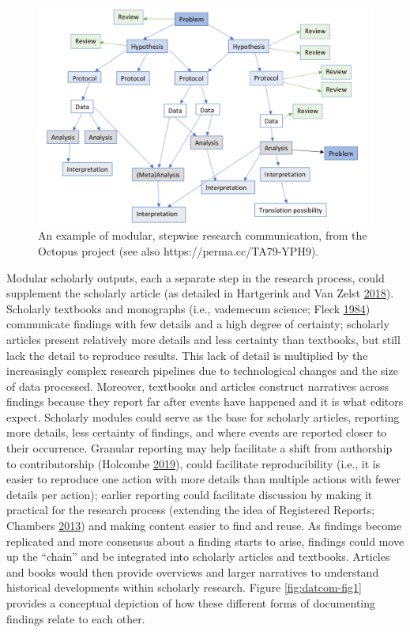 \documentclass[a5paper]{book}
\begin{document}
\begin{figure}[h]
\includegraphics[width=1\linewidth]{assets/figures/fig-octo} \caption{An example of modular, stepwise research communication, from the Octopus project (see also https://perma.cc/TA79-YPH9).}\label{fig:octopi}
\end{figure}

Modular scholarly outputs, each a separate step in the research process,
could supplement the scholarly article (as detailed in Hartgerink and
Van Zelst
\protect\hyperlink{ref-doi:10.3390ux2fpublications6020021}{2018}).
Scholarly textbooks and monographs (i.e., vademecum science; Fleck
\protect\hyperlink{ref-isbn:9780226253251}{1984}) communicate findings
with few details and a high degree of certainty; scholarly articles
present relatively more details and less certainty than textbooks, but
still lack the detail to reproduce results. This lack of detail is
multiplied by the increasingly complex research pipelines due to
technological changes and the size of data processed. Moreover,
textbooks and articles construct narratives across findings because they
report far after events have happened and it is what editors expect.
Scholarly modules could serve as the base for scholarly articles,
reporting more details, less certainty of findings, and where events are
reported closer to their occurrence. Granular reporting may help
facilitate a shift from authorship to contributorship (Holcombe
\protect\hyperlink{ref-doi:10.31234ux2fosf.ioux2fdt6e8}{2019}), could
facilitate reproducibility (i.e., it is easier to reproduce one action
with more details than multiple actions with fewer details per action);
earlier reporting could facilitate discussion by making it practical for
the research process (extending the idea of Registered Reports; Chambers
\protect\hyperlink{ref-doi:10.1016ux2fj.cortex.2012.12.016}{2013}) and
making content easier to find and reuse. As findings become replicated
and more consensus about a finding starts to arise, findings could move
up the \enquote{chain} and be integrated into scholarly articles and
textbooks. Articles and books would then provide overviews and larger
narratives to understand historical developments within scholarly
research. Figure \ref{fig:datcom-fig1} provides a conceptual depiction
of how these different forms of documenting findings relate to each
other.
\end{document}
